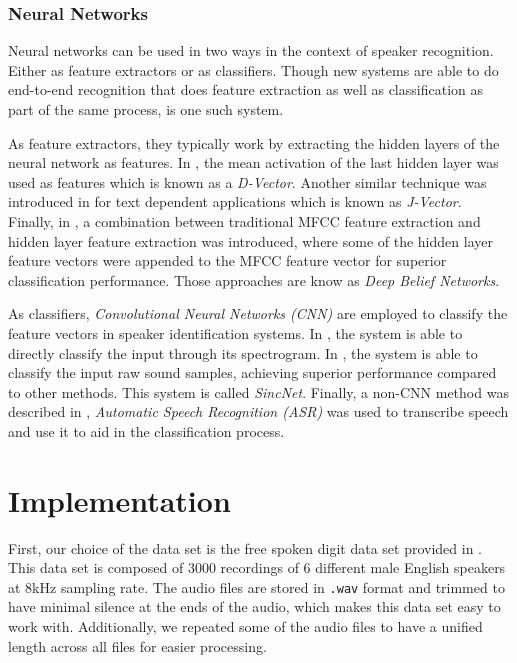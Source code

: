 \documentclass[twocolumn]{article}
\begin{document}
\subsubsection{Neural Networks}

Neural networks can be used in two ways in the context of speaker recognition.
Either as feature extractors or as classifiers. Though new systems are able to
do end-to-end recognition that does feature extraction as well as
classification as part of the same process, \autocite{Heigold2016} is one such
system.

As feature extractors, they typically work by extracting the hidden layers of
the neural network as features. In \autocite{Variani2014}, the mean activation
of the last hidden layer was used as features which is known as a
\emph{D-Vector}. Another similar technique was introduced in
\autocite{Chen2015} for text dependent applications which is known as
\emph{J-Vector}. Finally, in \autocite{Banerjee2018}, a combination between
traditional MFCC feature extraction and hidden layer feature extraction was
introduced, where some of the hidden layer feature vectors were appended to the
MFCC feature vector for superior classification performance. Those approaches
are know as \emph{Deep Belief Networks}.

As classifiers, \emph{Convolutional Neural Networks (CNN)} are employed to
classify the feature vectors in speaker identification systems.  In
\autocite{Hajavi2019}, the system is able to directly classify the input
through its spectrogram. In \autocite{Ravanelli2018}, the system is able to
classify the input raw sound samples, achieving superior performance compared
to other methods. This system is called \emph{SincNet}. Finally, a non-CNN
method was described in \autocite{Toshniwal2017}, \emph{Automatic Speech
Recognition (ASR)} was used to transcribe speech and use it to aid in the
classification process.

\section{Implementation}
\label{sec:Implementation}

First, our choice of the data set is the free spoken digit data set provided in
\autocite{Zohar2018}. This data set is composed of 3000 recordings of 6
different male English speakers at 8kHz sampling rate. The audio files are
stored in \texttt{.wav} format and trimmed to have minimal silence at the ends
of the audio, which makes this data set easy to work with. Additionally, we
repeated some of the audio files to have a unified length across all files for
easier processing.
\end{document}
